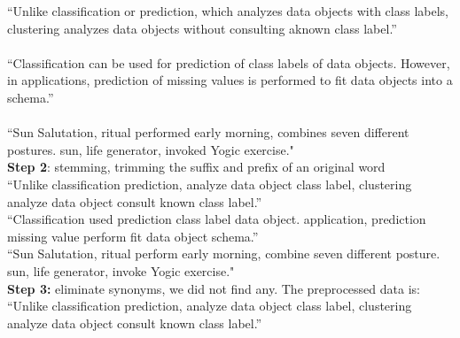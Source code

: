 \documentclass{article}
\theoremstyle{remark}
\newcommand{\re}[1]{\color{red}{#1}\color{black}\text{}}
\begin{document}
	\noindent“Unlike classification \color{red}or\color{black}\text{ } prediction, \color{red}which\color{black}\text{ } analyzes data objects \color{red}with\color{black}\text{ } class labels, clustering analyzes data objects \color{red}without\color{black}\text{ } consulting \color{red}a\color{black}\text{ }known class label.”\\\\
	
	\noindent“Classification \color{red}can\color{black}\text{ } \color{red}be\color{black}\text{ } used \color{red}for\color{black}\text{ } prediction \color{red}of\color{black}\text{ } class labels \color{red}of\color{black}\text{ } data objects. \color{red}However\color{black}\text{ }, \color{red}in\color{black}\text{ } \re{many} applications, prediction \color{red}of\color{black}\text{ } missing values \color{red}is\color{black}\text{ } performed \color{red}to\color{black}\text{ } fit data objects \color{red}into\color{black}\text{ } \color{red}a\color{black}\text{ } schema.”\\\\
	
	\noindent“Sun Salutation, \re{a} ritual performed \re{in} \re{the} early morning, combines seven different postures. \re{The} sun, \re{the} life generator, \re{is} invoked \re{by} \re{this} Yogic exercise."\\
	
	\noindent\textbf{Step 2}: stemming, trimming the suffix and prefix of an original word\\
	
	\noindent“Unlike classification  prediction,  analyze\re{s} data object\re{s}  class label\re{s}, clustering analyze\re{s} data object\re{s}  consult\re{ing} known class label.”\\
	
	\noindent“Classification  used  prediction  class label\re{s}  data object\re{s}. application\re{s}, prediction  missing value\re{s} perform\re{ed} fit data object\re{s} schema.”\\
	
	\noindent“Sun Salutation, ritual perform\re{ed} early morning, combine\re{s} seven different posture\re{s}. sun,  life generator, invoke\re{d} Yogic exercise."\\
	
	\noindent\textbf{Step 3:} eliminate synonyms, we did not find any. The preprocessed data is:\\
	
	\noindent“Unlike classification  prediction,  analyze data object class label, clustering analyze data object consult known class label.”\\
	
\end{document}
